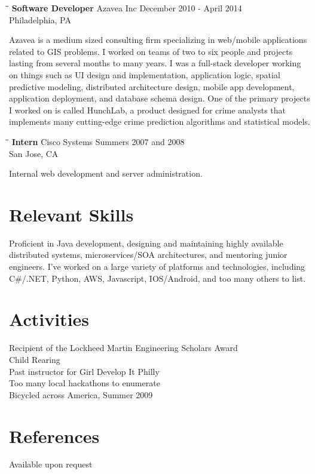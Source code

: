 \documentclass{res}
\begin{document}
\begin{resume}
   
   \begin{tabbing}
   \hspace{2.2in}\= \hspace{2.2in}\= \kill %
    {\bf Software Developer} \>Azavea Inc     \>December 2010 - April 2014\\
                             \>Philadelphia, PA
   \end{tabbing}\vspace{-17pt}      %
   Azavea is a medium sized consulting firm specializing in web/mobile applications related to GIS problems.  I worked on teams of two to six people and projects lasting from several months to many years.  I was a full-stack developer working on things such as UI design and implementation, application logic, spatial predictive modeling, distributed architecture design, mobile app development, application deployment, and database schema design.  One of the primary projects I worked on is called HunchLab, a product designed for crime analysts that implements many cutting-edge crime prediction algorithms and statistical models.
   \begin{tabbing}%
   \hspace{2.2in}\= \hspace{2.2in}\= \kill %
   {\bf Intern}  \> Cisco Systems\> Summers 2007 and 2008\\
                          \> San Jose, CA
   \end{tabbing}\vspace{-17pt}
   Internal web development and server administration.


\section{Relevant Skills}
Proficient in Java development, designing and maintaining highly available distributed systems, microservices/SOA architectures, and mentoring junior engineers.  I've worked on a large variety of platforms and technologies, including C\#/.NET, Python, AWS, Javascript, IOS/Android, and too many others to list.
 
\section{Activities}
    Recipient of the Lockheed Martin Engineering Scholars Award\\
    Child Rearing\\
    Past instructor for Girl Develop It Philly\\
    Too many local hackathons to enumerate\\
    Bicycled across America, Summer 2009

\section{References}
    Available upon request
 
\end{resume}
\end{document}
